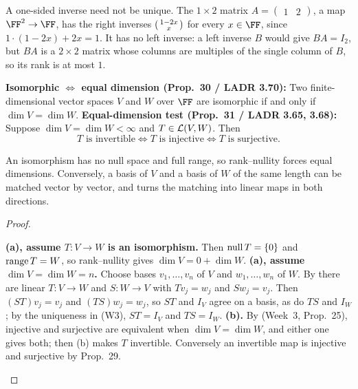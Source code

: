 \documentclass[10pt]{scrartcl}
\begin{document}
A one-sided inverse need not be unique. The $1\times2$ matrix $A=\begin{pmatrix}1&2\end{pmatrix}$, a map $\FF^2\to\FF$, has the right inverses $\begin{psmallmatrix}1-2x\\x\end{psmallmatrix}$ for every $x\in\FF$, since $1\cdot(1-2x)+2x=1$. It has no left inverse: a left inverse $B$ would give $BA=I_2$, but $BA$ is a $2\times2$ matrix whose columns are multiples of the single column of $B$, so its rank is at most $1$.

\begin{theorem*}
  \begin{enumerate}[(a)]
    \ii \textbf{Isomorphic $\iff$ equal dimension (Prop.~30 / LADR 3.70):} Two finite-dimensional vector spaces $V$ and $W$ over $\FF$ are isomorphic if and only if $\dim V=\dim W$.
    \ii \textbf{Equal-dimension test (Prop.~31 / LADR 3.65, 3.68):} Suppose $\dim V=\dim W<\infty$ and $T\in\mathcal L(V,W)$. Then
    \[
      T\text{ is invertible} \iff T\text{ is injective} \iff T\text{ is surjective}.
    \]
  \end{enumerate}
\end{theorem*}
\begin{ideabox}
  An isomorphism has no null space and full range, so rank--nullity forces equal dimensions. Conversely, a basis of $V$ and a basis of $W$ of the same length can be matched vector by vector, and  turns the matching into linear maps in both directions.
\end{ideabox}
\begin{proof}
  \begin{steps}
    \ii \textbf{(a), assume $T\colon V\to W$ is an isomorphism.} Then $\operatorname{null} T=\{0\}$ and $\operatorname{range} T=W$, so rank--nullity  gives $\dim V=0+\dim W$.
    \ii \textbf{(a), assume $\dim V=\dim W=n$.} Choose bases $v_1,\dots,v_n$ of $V$ and $w_1,\dots,w_n$ of $W$. By  there are linear $T\colon V\to W$ and $S\colon W\to V$ with $Tv_j=w_j$ and $Sw_j=v_j$. Then $(ST)v_j=v_j$ and $(TS)w_j=w_j$, so $ST$ and $I_V$ agree on a basis, as do $TS$ and $I_W$; by the uniqueness in (W3), $ST=I_V$ and $TS=I_W$.
    \ii \textbf{(b).} By  (Week~3, Prop.~25), injective and surjective are equivalent when $\dim V=\dim W$, and either one gives both; then (b) makes $T$ invertible. Conversely an invertible map is injective and surjective by Prop.~29.
  \end{steps}
\end{proof}
\end{document}
